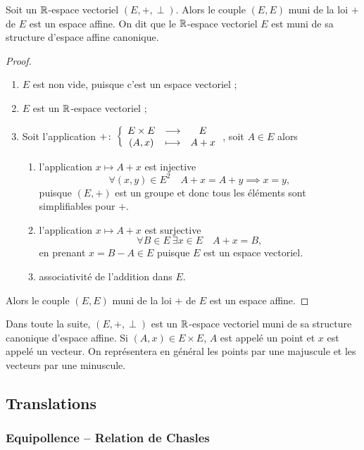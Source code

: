 \begin{prop}
  Soit un \(\mathbb{R}\)-espace vectoriel \((E,+,\perp)\). Alors le couple \((E,E)\) muni de la loi \(+\) de \(E\) est un espace affine. On dit que le \(\mathbb{R}\)-espace vectoriel \(E\) est muni de sa structure d'espace affine canonique.
\end{prop}
\begin{proof}
  \begin{enumerate}
    \item \(E\) est non vide, puisque c'est un espace vectoriel ;
    \item \(E\) est un \(\mathbb{R}\)-espace vectoriel ;
    \item Soit l'application \(+\colon \left\{\begin{array}{ccc} E\times E & \longrightarrow &E\\ (A,x) & \longmapsto & A+x \end{array} \right.\), soit \(A \in E\) alors
      \begin{enumerate}
        \item l'application \(x \longmapsto A+x\) est injective
          \begin{equation}
            \forall (x,y) \in E^2 \quad A+x=A+y \implies x=y,
          \end{equation}
          puisque \((E,+)\) est un groupe et donc tous les éléments sont simplifiables pour \(+\).
        \item l'application \(x \longmapsto A+x\) est surjective
          \begin{equation}
            \forall B \in E \ \exists x \in E \quad A+x=B,
          \end{equation}
          en prenant \(x=B-A \in E\) puisque \(E\) est un espace vectoriel.
        \item associativité de l'addition dans \(E\).
      \end{enumerate}
  \end{enumerate}
  Alors le couple \((E,E)\) muni de la loi \(+\) de \(E\) est un espace affine.
\end{proof}

Dans toute la suite, \((E,+,\perp)\) est un \(\mathbb{R}\)-espace vectoriel muni de sa structure canonique d'espace affine. Si \((A,x) \in E\times E\), \(A\) est appelé un point et \(x\) est appelé un vecteur. On représentera en général les points par une majuscule et les vecteurs par une minuscule.

\subsection{Translations}

\subsubsection{Equipollence -- Relation de Chasles}

